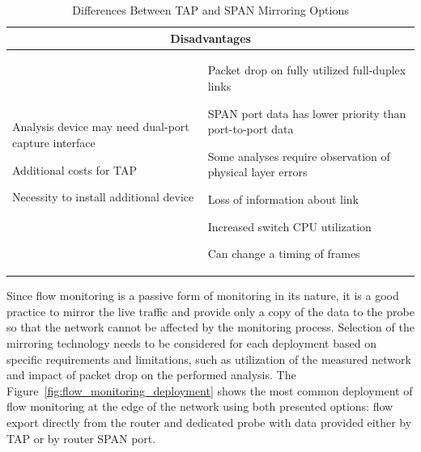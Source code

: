\begin{table}[t!]
\begin{tabularx}{\textwidth}{XX}
		\multicolumn{2}{c}{Disadvantages} \\ \midrule
		\begin{compactitem}
			\item Analysis device may need dual-port capture interface
			\item Additional costs for TAP
			\item Necessity to install additional device
		\end{compactitem}
		& 
		\begin{compactitem}
			\item Packet drop on fully utilized full-duplex links
			\item SPAN port data has lower priority than port-to-port data
			\item Some analyses require observation of physical layer errors
			\item Loss of information about link
			\item Increased switch CPU utilization
			\item Can change a timing of frames
		\end{compactitem}
		\\ \bottomrule
	\end{tabularx}
	\caption{Differences Between TAP and SPAN Mirroring Options}
	\label{tab:tap_vs_span}
\end{table}

Since flow monitoring is a passive form of monitoring in its nature, it is a good practice to mirror the live traffic and provide only a copy of the data to the probe so that the network cannot be affected by the monitoring process. Selection of the mirroring technology needs to be considered for each deployment based on specific requirements and limitations, such as utilization of the measured network and impact of packet drop on the performed analysis. The Figure~\ref{fig:flow_monitoring_deployment} shows the most common deployment of flow monitoring at the edge of the network using both presented options: flow export directly from the router and dedicated probe with data provided either by TAP or by router SPAN port.

